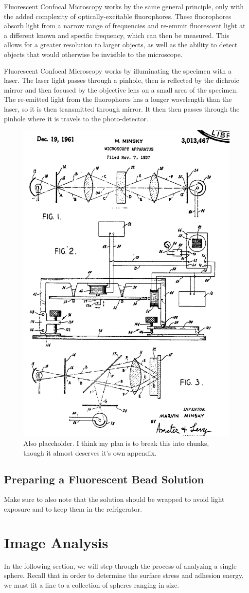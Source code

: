Fluorescent Confocal Microscopy works by the same general principle, only with the added complexity of optically-excitable fluorophores. These fluorophores absorb light from a narrow range of frequencies and re-emmit fluorescent light at a different known and specific frequency, which can then be measured. This allows for a greater resolution to larger objects, as well as the ability to detect objects that would otherwise be invisible to the microscope.  

Fluorescent Confocal Microscopy works by illuminating the specimen with a laser. The laser light passes through a pinhole, then is reflected by the dichroic mirror and then focused by the objective lens on a small area of the specimen. The re-emitted light from the fluorophores has a longer wavelength than the laser, so it is then transmitted through mirror.  It then then passes through the pinhole where it is travels to the photo-detector.

\begin{figure}[h!]
	\centering
	\includegraphics[width=.3\linewidth]{confocal_stuff/confocalpatent}
	\caption[Minsky Patent Diagram]{Also placeholder. I think my plan is to break this into chunks, though it almost deserves it's own appendix.}
	\label{fig:confocalpatent}
\end{figure}
\cite{patent:3013467} 

\subsection{Preparing a Fluorescent Bead Solution}
Make sure to also note that the solution should be wrapped to avoid light exposure and to keep them in the refrigerator. 

\section{Image Analysis}
In the following section, we will step through the process of analyzing a single sphere. Recall that in order to determine the surface stress and adhesion energy, we must fit a line to a collection of spheres ranging in size.  

